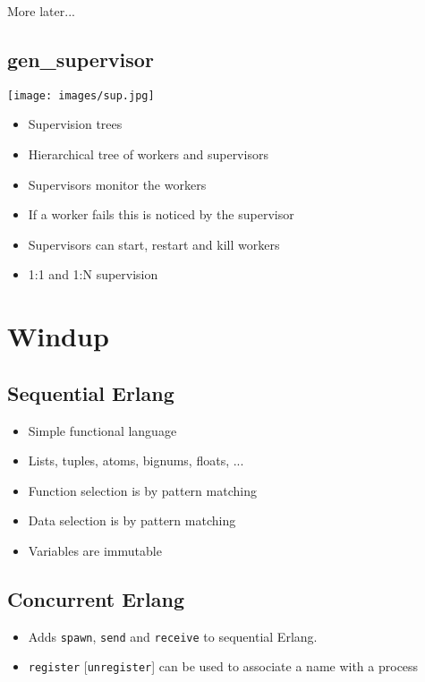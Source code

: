 \documentclass[12pt]{article}
\begin{document}
More later...

\subsection{gen\_supervisor}

\texttt{[image: images/sup.jpg]}

\begin{itemize}
\item Supervision trees
\item Hierarchical tree of workers and supervisors
\item Supervisors monitor the workers
\item If a worker fails this is noticed by the supervisor
\item Supervisors can start, restart and kill workers
\item 1:1 and 1:N supervision
\end{itemize}

\section{Windup}

\subsection{Sequential Erlang}

\begin{itemize}
\item Simple functional language
\item Lists, tuples, atoms, bignums, floats, ...
\item Function selection is by pattern matching
\item Data selection is by pattern matching
\item Variables are immutable
\end{itemize}

\subsection{Concurrent Erlang}

\begin{itemize}
\item Adds \verb+spawn+, \verb+send+ and \verb+receive+ to sequential Erlang.
\item \verb+register+ [\verb+unregister+] can be used to associate a name with a process
\end{itemize}
\end{document}
